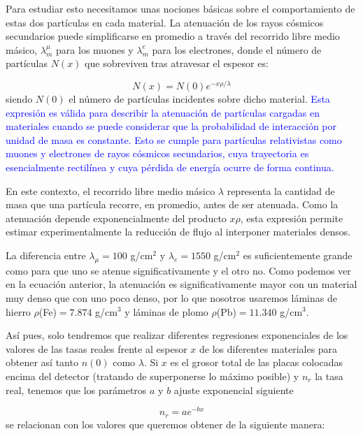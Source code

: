 \documentclass[11pt]{article}
\begin{document}
Para estudiar esto necesitamos unas nociones básicas sobre el comportamiento de estas dos partículas en cada material. La atenuación de los rayos cósmicos secundarios puede simplificarse en promedio a través del recorrido libre medio másico, $\lambda_ m^{\mu}$ para los muones y $\lambda_m^e$ para los electrones, donde el número de partículas $N(x)$ que sobreviven tras atravesar el espesor es: 

\begin{equation}
	N(x)  = N(0) e^{-x\rho/\lambda}
\end{equation}
siendo $N(0)$ el número de partículas incidentes sobre dicho material. \textcolor{blue}{Esta expresión es válida para describir la atenuación de partículas cargadas en materiales cuando se puede considerar que la probabilidad de interacción por unidad de masa es constante. Esto se cumple para partículas relativistas como muones y electrones de rayos cósmicos secundarios, cuya trayectoria es esencialmente rectilínea y cuya pérdida de energía ocurre de forma continua.}

En este contexto, el recorrido libre medio másico $\lambda$ representa la cantidad de masa que una partícula recorre, en promedio, antes de ser atenuada. Como la atenuación depende exponencialmente del producto $x\rho$, esta expresión permite estimar experimentalmente la reducción de flujo al interponer materiales densos. 

La diferencia entre $\lambda_\mu=100$ g/cm$^2$ y $\lambda_e=1550$ g/cm$^2$ es suficientemente grande como para que uno se atenue significativamente y el otro no. Como podemos ver en la ecuación anterior, la atenuación es significativamente mayor con un material muy denso que con uno poco denso, por lo que nosotros usaremos láminas de hierro $\rho$(Fe)$=7.874$ g/cm$^3$ y láminas de plomo $\rho$(Pb)$=11.340$ g/cm$^3$. 

Así pues, solo tendremos que realizar diferentes regresiones exponenciales de los valores de las tasas reales frente al espesor $x$ de los diferentes materiales para obtener así tanto $n(0)$ como $\lambda$. Si $x$ es el grosor total de las placas colocadas encima del detector (tratando de superponerse lo máximo posible) y $n_r$ la tasa real, tenemos que los parámetros $a$ y $b$ ajuste exponencial siguiente

\begin{equation}
	n_r = a e^{-bx}
\end{equation}
se relacionan con los valores que queremos obtener de la siguiente manera:
\end{document}
